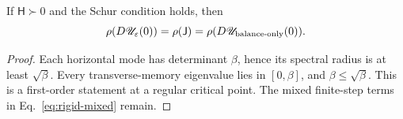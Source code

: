 \begin{corollary}
If $\mathsf H\succ0$ and the Schur condition holds, then
\begin{equation}
\rho(D\mathscr U_\varepsilon(0))
=\rho(\mathsf J)
=\rho(D\mathscr U_{\rm balance\text{-}only}(0)).
\end{equation}
\end{corollary}
\begin{proof}
Each horizontal mode has determinant $\beta$, hence its spectral
radius is at least $\sqrt\beta$. Every transverse-memory eigenvalue
lies in $[0,\beta]$, and $\beta\leq\sqrt\beta$.
This is a first-order statement at a regular critical point.
The mixed finite-step terms in Eq.~\eqref{eq:rigid-mixed} remain.
\end{proof}


